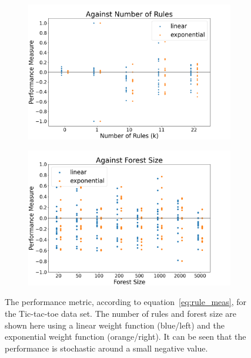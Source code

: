 \documentclass[10pt]{article}
\begin{document}
\begin{figure}[ht]
\centering
\begin{subfigure}{0.49\textwidth}
\includegraphics[width = \textwidth]{images/rules_performance_meas.png}
\end{subfigure}
\hfill
\begin{subfigure}{0.49\textwidth}
\includegraphics[width = \textwidth]{images/forest_performance_meas.png}
\end{subfigure}
\caption{The performance metric, according to equation~\ref{eq:rule_meas}, for the Tic-tac-toe data set. The number of rules and forest size are shown here using a linear weight function (blue/left) and the exponential weight function (orange/right). It can be seen that the performance is stochastic around a small negative value.}
\label{fig:quant_stat}
\end{figure}
\end{document}
